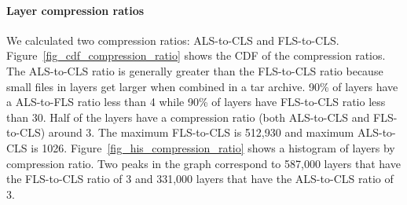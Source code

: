 \paragraph{Layer compression ratios}
%
We calculated two compression ratios: ALS-to-CLS and FLS-to-CLS.
Figure~\ref{fig_cdf_compression_ratio} shows the CDF of the compression ratios.
%
The ALS-to-CLS ratio is generally greater than the FLS-to-CLS ratio
because small files in layers get larger when combined in a tar archive.
%
90\% of layers have a  ALS-to-FLS ratio less than 4 while 90\% of
layers have FLS-to-CLS ratio less than 30.
%
Half of the layers have a compression ratio (both ALS-to-CLS and
FLS-to-CLS) around 3.
%
The maximum FLS-to-CLS is 512,930 and maximum ALS-to-CLS is 1026.
%
Figure~\ref{fig_his_compression_ratio} shows a histogram of layers by
compression ratio.
%
Two peaks in the graph correspond to 587,000 layers that have the FLS-to-CLS ratio of 3
and 331,000 layers that have the ALS-to-CLS ratio of 3.


